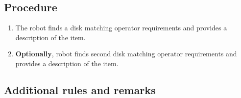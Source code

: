 \subsection*{Procedure}

\begin{enumerate}
	\item The robot finds a disk matching operator requirements and provides a description of the item.
	\item \textbf{Optionally}, robot finds second disk matching operator requirements and provides a description of the item.
\end{enumerate}

\subsection*{Additional rules and remarks}

